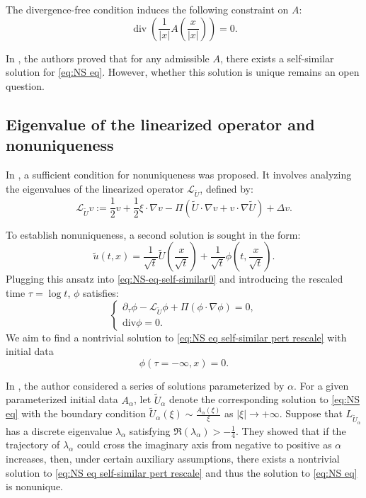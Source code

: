 \documentclass[11pt,a4paper]{article}
\numberwithin{equation}{section}
\newcommand{\assign}{:=}
\newcommand{\cdummy}{\cdot}
\newcommand{\tmop}[1]{\ensuremath{\operatorname{#1}}}
\begin{document}
The divergence-free condition induces the following constraint on $A$:
\begin{equation}
  \tmop{div} ( \frac{1}{| x |} A ( \frac{x}{| x |} ) ) =
  0. \label{eq:A constraint}
\end{equation}

In {\cite{jia2014local}}, the authors proved that for any admissible
$A$, there exists a self-similar solution for \eqref{eq:NS eq}. However, whether this solution is unique remains an open question.
\subsection{Eigenvalue of the linearized operator and nonuniqueness}
In {\cite{jia2015incompressible}}, a sufficient condition for nonuniqueness was
proposed. It involves analyzing the eigenvalues of the linearized operator
$\mathcal{L}_{\widetilde{U}}$, defined by:
\begin{equation}
  \mathcal{L}_{\widetilde{U}} v \assign  \frac{1}{2} v + \frac{1}{2} \xi \cdummy
  \nabla v - \Pi (\widetilde{U} \cdot \nabla v + v \cdot \nabla \widetilde{U}) +
  \Delta v. \label{eq:LU def}
\end{equation}

To establish nonuniqueness, a second solution is sought in the form:
\[ \widetilde{u} (t, x) = \frac{1}{\sqrt{t}} \widetilde{U} ( \frac{x}{\sqrt{t}}
   ) + \frac{1}{\sqrt{t}} \phi ( t, \frac{x}{\sqrt{t}} ) . \]
Plugging this ansatz into \eqref{eq:NS-eq-self-similar0} and introducing the rescaled
time $\tau = \log t$,  $\phi$ satisfies:
\begin{equation}
  \left\{\begin{array}{l}
    \partial_{\tau} \phi -\mathcal{L}_{\widetilde{U}} \phi + \Pi (\phi \cdot
    \nabla \phi) = 0,\\
    \mathrm{div} \phi = 0.
  \end{array}\right. \label{eq:NS eq self-similar pert rescale}
\end{equation}
We aim to find a nontrivial solution to \eqref{eq:NS eq self-similar pert
rescale} with initial data
\[ \phi (\tau = - \infty, x) = 0. \]

In {\cite{jia2015incompressible}}, the author considered a series of solutions
parameterized by $\alpha$. For a given parameterized initial data
$A_{\alpha}$, let $\widetilde{U}_{\alpha}$ denote the corresponding solution to
\eqref{eq:NS eq} with the boundary condition $\widetilde{U}_{\alpha} (\xi) \sim
\frac{A_{\alpha} (\xi)}{\xi}$ as $| \xi | \to + \infty$. Suppose that
$L_{\widetilde{U}_{\alpha}}$ has a discrete eigenvalue $\lambda_{\alpha}$
satisfying $\Re (\lambda_{\alpha}) > -\frac{1}{4}$. They showed that if the
trajectory of $\lambda_{\alpha}$ could cross the imaginary axis from negative
to positive as $\alpha$ increases, then, under certain auxiliary assumptions, there exists a nontrivial solution to \eqref{eq:NS eq self-similar pert
rescale} and thus the solution to \eqref{eq:NS eq} is nonunique.
\end{document}
